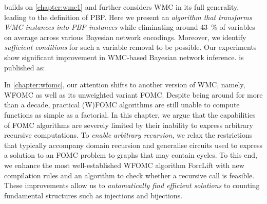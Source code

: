 
 builds on \cref{chapter:wmc1} and further considers WMC in its full generality, leading to the definition of PBP. Here we present an \emph{algorithm that transforms WMC instances into PBP instances} while eliminating around \SI{43}{\percent} of variables on average across various Bayesian network encodings. Moreover, we identify \emph{sufficient conditions} for such a variable removal to be possible. Our experiments show significant improvement in WMC-based Bayesian network inference.  is published as:
\begin{displayquote}
\end{displayquote}


In \cref{chapter:wfomc}, our attention shifts to another version of WMC, namely, WFOMC as well as its unweighted variant FOMC. Despite being around for more than a decade, practical (W)FOMC algorithms are still unable to compute functions as simple as a factorial. In this chapter, we argue that the capabilities of FOMC algorithms are severely limited by their inability to express arbitrary recursive computations. To \emph{enable arbitrary recursion}, we relax the restrictions that typically accompany domain recursion and generalise circuits used to express a solution to an FOMC problem to graphs that may contain cycles. To this end, we enhance the most well-established WFOMC algorithm ForcLift \citep{DBLP:conf/ijcai/BroeckTMDR11} with new compilation rules and an algorithm to check whether a recursive call is feasible. These improvements allow us to \emph{automatically find efficient solutions} to counting fundamental structures such as injections and bijections.


